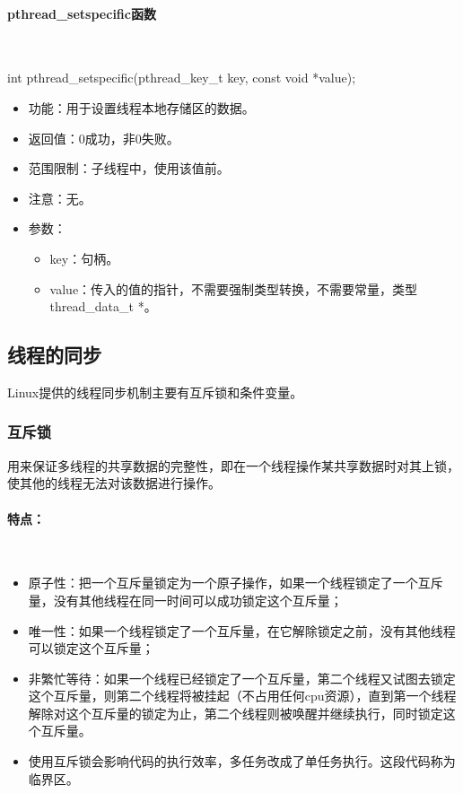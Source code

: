 \documentclass[UTF8]{article}%
\begin{document}
\paragraph{pthread\_setspecific函数}~{}

int pthread\_setspecific(pthread\_key\_t key, const void *value);

\begin{itemize}
    \item 功能：用于设置线程本地存储区的数据。
    \item 返回值：0成功，非0失败。
    \item 范围限制：子线程中，使用该值前。
    \item 注意：无。
    \item 参数：
    {
        \begin{itemize}
            \item key：句柄。
            \item value：传入的值的指针，不需要强制类型转换，不需要常量，类型thread\_data\_t *。
        \end{itemize}
    }
\end{itemize}

\subsection{线程的同步}

Linux提供的线程同步机制主要有互斥锁和条件变量。

\subsubsection{互斥锁}

用来保证多线程的共享数据的完整性，即在一个线程操作某共享数据时对其上锁，使其他的线程无法对该数据进行操作。

\paragraph{特点：}~{}
\begin{itemize}
    \item 原子性：把一个互斥量锁定为一个原子操作，如果一个线程锁定了一个互斥量，没有其他线程在同一时间可以成功锁定这个互斥量；
    \item 唯一性：如果一个线程锁定了一个互斥量，在它解除锁定之前，没有其他线程可以锁定这个互斥量；
    \item 非繁忙等待：如果一个线程已经锁定了一个互斥量，第二个线程又试图去锁定这个互斥量，则第二个线程将被挂起（不占用任何cpu资源），直到第一个线程解除对这个互斥量的锁定为止，第二个线程则被唤醒并继续执行，同时锁定这个互斥量。
    \item 使用互斥锁会影响代码的执行效率，多任务改成了单任务执行。这段代码称为临界区。
\end{itemize}
\end{document}
